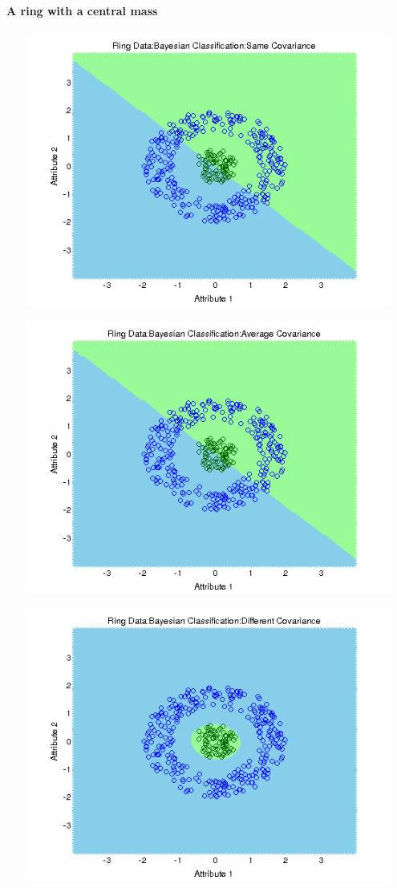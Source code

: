 \documentclass[a4paper]{article}
\begin{document}
			\paragraph{A ring with a central mass}
			\centerline{\includegraphics[width=160mm,height=90mm]{plots/bayes/nls/ring/same_cov.png}}
 			\centerline{\includegraphics[width=160mm,height=90mm]{plots/bayes/nls/ring/avg_cov.png}}
 			\centerline{\includegraphics[width=160mm,height=90mm]{plots/bayes/nls/ring/diff_cov.png}}
\end{document}
